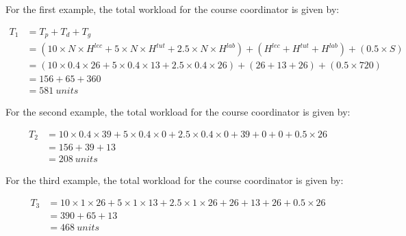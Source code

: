 For the first example, the total workload for the course coordinator is given by:

\begin{equation}
  \nonumber
  \begin{aligned}
    T_1 & = T_p + T_d + T_g                                                                                                                         \\
        & = (10 \times N \times H^{lec} + 5 \times N \times H^{tut} + 2.5 \times N \times H^{lab}) + (H^{lec} + H^{tut} + H^{lab}) + (0.5 \times S) \\
        & = (10 \times 0.4 \times 26 + 5 \times 0.4 \times 13 + 2.5 \times 0.4 \times 26) + (26 + 13 + 26) + (0.5 \times 720)                       \\
        & = 156 + 65 + 360                                                                                                                          \\
        & = 581\ units
  \end{aligned}
\end{equation}

For the second example, the total workload for the course coordinator is given by:

\begin{equation}
  \nonumber
  \begin{aligned}
    T_2 & = 10 \times 0.4 \times 39 + 5 \times 0.4 \times 0 + 2.5 \times 0.4 \times 0 + 39 + 0 + 0 + 0.5 \times 26 \\
        & = 156 + 39 + 13                                                                                          \\
        & = 208\ units
  \end{aligned}
\end{equation}

For the third example, the total workload for the course coordinator is given by:

\begin{equation}
  \nonumber
  \begin{aligned}
    T_3 & = 10 \times 1 \times 26 + 5 \times 1 \times 13 + 2.5 \times 1 \times 26 + 26 + 13 + 26 + 0.5 \times 26 \\
        & = 390 + 65 + 13                                                                                        \\
        & = 468\ units
  \end{aligned}
\end{equation}

